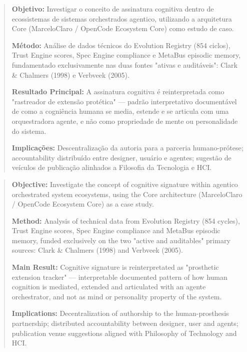 

\begin{abstract}
\textbf{Objetivo:} Investigar o conceito de assinatura cognitiva dentro de ecossistemas de sistemas orchestrados agentico, utilizando a arquitetura Core (MarceloClaro / OpenCode Ecosystem Core) como estudo de caso.

\textbf{Método:} Análise de dados técnicos do Evolution Registry (854 ciclos), Trust Engine scores, Spec Engine compliance e MetaBus episodic memory, fundamentado exclusivamente nas duas fontes "ativas e auditáveis": Clark & Chalmers (1998) e Verbveek (2005).

\textbf{Resultado Principal:} A assinatura cognitiva é reinterpretada como "rastreador de extensão protética" — padrão interpretativo documentável de como a cogniência humana se media, estende e se articula com uma orquestradora agente, e não como propriedade de mente ou personalidade do sistema.

\textbf{Implicações:} Descentralização da autoria para a parceria humano-prótese; accountability distribuído entre designer, usuário e agentes; sugestão de veículos de publicação alinhados a Filosofia da Tecnologia e HCI.
\end{abstract}

\begin{abstract}
\textbf{Objective:} Investigate the concept of cognitive signature within agentico orchestrated system ecosystems, using the Core architecture (MarceloClaro / OpenCode Ecosystem Core) as a case study.

\textbf{Method:} Analysis of technical data from Evolution Registry (854 cycles), Trust Engine scores, Spec Engine compliance and MetaBus episodic memory, funded exclusively on the two "active and auditables" primary sources: Clark \& Chalmers (1998) and Verbveek (2005).

\textbf{Main Result:} Cognitive signature is reinterpretated as "prosthetic extension tracker" — interpretable documented pattern of how human cognition is mediated, extended and articulated with an agente orchestrator, and not as mind or personality property of the system.

\textbf{Implications:} Decentralization of authorship to the human-prosthesis partnership; distributed accountability between designer, user and agents; publication venue suggestions aligned with Philosophy of Technology and HCI.
\end{abstract}

